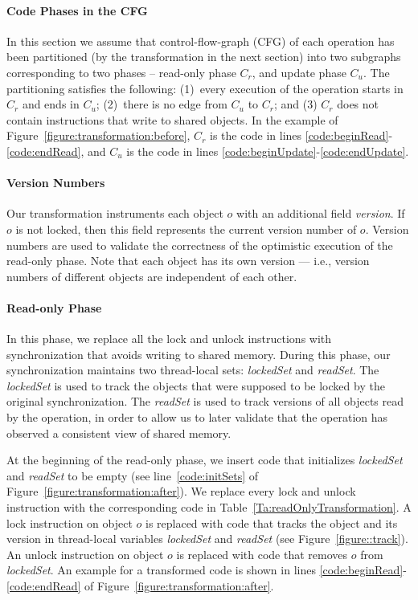 \paragraph{Code Phases in the CFG}
In this section we assume that 
control-flow-graph (CFG) of each operation has been partitioned (by the transformation in the next section)
into two subgraphs corresponding to two phases -- 
read-only phase $C_r$, and update phase $C_u$. The partitioning satisfies the following:
(1)~every execution of the operation starts in $C_r$ and ends in $C_u$; (2)~there is no edge from $C_u$ to  $C_r$;
and (3) $C_r$ does not contain instructions that write to shared objects.
%
In the example of Figure~\ref{figure:transformation:before}, $C_r$ is the code in lines \ref{code:beginRead}-\ref{code:endRead},
and $C_u$ is the code in lines \ref{code:beginUpdate}-\ref{code:endUpdate}.

\paragraph{Version Numbers}
Our transformation instruments each object $o$ with an additional field \emph{version}.
If $o$ is not locked, then this field  represents the current version number of $o$.
Version numbers are used to validate the correctness of the optimistic execution of the read-only phase.
Note that each object has its own version --- i.e., version numbers of different objects are independent of each other.

\paragraph{Read-only Phase}
In this phase, we replace all the lock and unlock instructions with synchronization that avoids writing to shared memory.
During this phase, our synchronization maintains two thread-local sets: \emph{lockedSet} and \emph{readSet}.
The \emph{lockedSet} is used to track the objects that were supposed to be locked by the original synchronization.
The \emph{readSet} is used to track versions of all objects read by the
operation, in order to allow us to later validate that the operation has observed a consistent view of shared memory.

At the beginning of the read-only phase, we insert code that initializes \emph{lockedSet} and \emph{readSet} to be empty (see  line~\ref{code:initSets} of Figure~\ref{figure:transformation:after}).
We replace every lock and unlock instruction with the corresponding code in Table~\ref{Ta:readOnlyTransformation}.
A lock instruction on object $o$ is replaced with code that tracks the object and its version in 
thread-local variables \emph{lockedSet} and \emph{readSet} (see Figure~\ref{figure::track}).
An unlock instruction on object $o$ is replaced with code that removes $o$ from \emph{lockedSet}.
An example for a transformed code is shown in lines \ref{code:beginRead}-\ref{code:endRead} of Figure~\ref{figure:transformation:after}.

